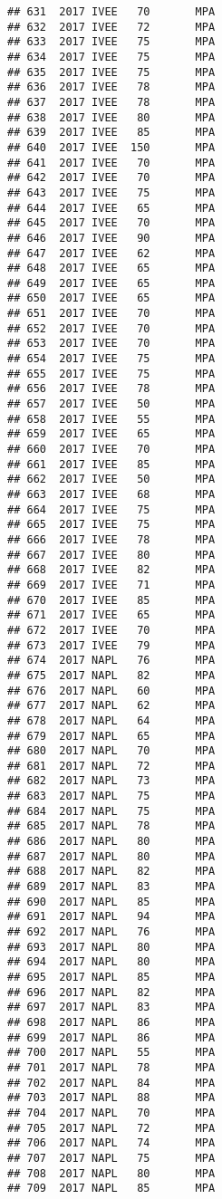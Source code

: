 \documentclass[]{article}
\begin{document}
\begin{verbatim}
## 631  2017 IVEE   70       MPA
## 632  2017 IVEE   72       MPA
## 633  2017 IVEE   75       MPA
## 634  2017 IVEE   75       MPA
## 635  2017 IVEE   75       MPA
## 636  2017 IVEE   78       MPA
## 637  2017 IVEE   78       MPA
## 638  2017 IVEE   80       MPA
## 639  2017 IVEE   85       MPA
## 640  2017 IVEE  150       MPA
## 641  2017 IVEE   70       MPA
## 642  2017 IVEE   70       MPA
## 643  2017 IVEE   75       MPA
## 644  2017 IVEE   65       MPA
## 645  2017 IVEE   70       MPA
## 646  2017 IVEE   90       MPA
## 647  2017 IVEE   62       MPA
## 648  2017 IVEE   65       MPA
## 649  2017 IVEE   65       MPA
## 650  2017 IVEE   65       MPA
## 651  2017 IVEE   70       MPA
## 652  2017 IVEE   70       MPA
## 653  2017 IVEE   70       MPA
## 654  2017 IVEE   75       MPA
## 655  2017 IVEE   75       MPA
## 656  2017 IVEE   78       MPA
## 657  2017 IVEE   50       MPA
## 658  2017 IVEE   55       MPA
## 659  2017 IVEE   65       MPA
## 660  2017 IVEE   70       MPA
## 661  2017 IVEE   85       MPA
## 662  2017 IVEE   50       MPA
## 663  2017 IVEE   68       MPA
## 664  2017 IVEE   75       MPA
## 665  2017 IVEE   75       MPA
## 666  2017 IVEE   78       MPA
## 667  2017 IVEE   80       MPA
## 668  2017 IVEE   82       MPA
## 669  2017 IVEE   71       MPA
## 670  2017 IVEE   85       MPA
## 671  2017 IVEE   65       MPA
## 672  2017 IVEE   70       MPA
## 673  2017 IVEE   79       MPA
## 674  2017 NAPL   76       MPA
## 675  2017 NAPL   82       MPA
## 676  2017 NAPL   60       MPA
## 677  2017 NAPL   62       MPA
## 678  2017 NAPL   64       MPA
## 679  2017 NAPL   65       MPA
## 680  2017 NAPL   70       MPA
## 681  2017 NAPL   72       MPA
## 682  2017 NAPL   73       MPA
## 683  2017 NAPL   75       MPA
## 684  2017 NAPL   75       MPA
## 685  2017 NAPL   78       MPA
## 686  2017 NAPL   80       MPA
## 687  2017 NAPL   80       MPA
## 688  2017 NAPL   82       MPA
## 689  2017 NAPL   83       MPA
## 690  2017 NAPL   85       MPA
## 691  2017 NAPL   94       MPA
## 692  2017 NAPL   76       MPA
## 693  2017 NAPL   80       MPA
## 694  2017 NAPL   80       MPA
## 695  2017 NAPL   85       MPA
## 696  2017 NAPL   82       MPA
## 697  2017 NAPL   83       MPA
## 698  2017 NAPL   86       MPA
## 699  2017 NAPL   86       MPA
## 700  2017 NAPL   55       MPA
## 701  2017 NAPL   78       MPA
## 702  2017 NAPL   84       MPA
## 703  2017 NAPL   88       MPA
## 704  2017 NAPL   70       MPA
## 705  2017 NAPL   72       MPA
## 706  2017 NAPL   74       MPA
## 707  2017 NAPL   75       MPA
## 708  2017 NAPL   80       MPA
## 709  2017 NAPL   85       MPA

\end{verbatim}
\end{document}

